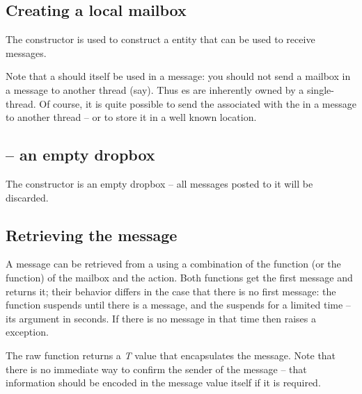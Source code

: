 \subsection{Creating a local mailbox}
\label{message:mailbox}

The  constructor is used to construct a  entity that can be used to receive messages. 

\begin{aside}
Note that a  should itself be used in a message: you should not send a mailbox in a message to another thread (say). Thus es are inherently owned by a single-thread. Of course, it is quite possible to send the  associated with the  in a message to another thread -- or to store it in a well known location.
\end{aside}

\subsection{ -- an empty dropbox}
\label{mbox:nullhandle}
The  constructor is an empty dropbox -- all messages posted to it will be discarded.

\subsection{Retrieving the  message}
\label{action:receive}


A message can be retrieved from a  using a combination of the  function (or the  function) of the mailbox and the  action. Both functions get the first message and returns it; their behavior differs in the case that there is no first message: the  function suspends until there is a message, and the  suspends for a limited time -- its argument in seconds. If there is no message in that time then  raises a  exception.

The raw  function returns a \emph{T} value that encapsulates the message. Note that there is no immediate way to confirm the sender of the message -- that information should be encoded in the message value itself if it is required.

